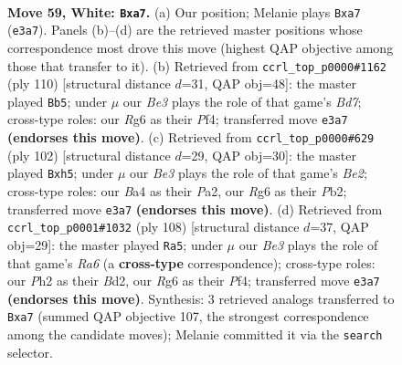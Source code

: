 \documentclass[11pt]{article}
\begin{document}
\clearpage

\begin{figure}[p]\centering
\begin{subfigure}{0.46\textwidth}\centering
\resizebox{\linewidth}{!}{%
\newchessgame
\chessboard[
  setfen={2k5/p1p5/6R1/3n1p2/B4P2/4B3/2K4P/8 w - - 1 59},
  showmover=false,
  pgfstyle=straightmove, color=movearrow, markmove={e3-a7}
]}
\caption{}
\end{subfigure}\hfill
\begin{subfigure}{0.46\textwidth}\centering
\resizebox{\linewidth}{!}{%
\newchessgame
\chessboard[
  setfen={8/3B1pk1/1p6/2n2p2/P4P1P/4K3/8/8 w - - 9 56},
  showmover=false,
  pgfstyle=straightmove, color=movearrow, markmove={d7-b5}
]}
\caption{}
\end{subfigure}
\\[4pt]
\begin{subfigure}{0.46\textwidth}\centering
\resizebox{\linewidth}{!}{%
\newchessgame
\chessboard[
  setfen={8/p7/8/6kp/1pK5/6n1/PP2B3/8 w - - 0 52},
  showmover=false,
  pgfstyle=straightmove, color=movearrow, markmove={e2-h5}
]}
\caption{}
\end{subfigure}\hfill
\begin{subfigure}{0.46\textwidth}\centering
\resizebox{\linewidth}{!}{%
\newchessgame
\chessboard[
  setfen={2b5/5k2/R4p2/7n/5Pp1/8/3B1K1P/8 w - - 6 55},
  showmover=false,
  pgfstyle=straightmove, color=movearrow, markmove={a6-a5}
]}
\caption{}
\end{subfigure}
\caption{\textbf{Move 59, White: \texttt{Bxa7}.} (a) Our position; Melanie plays \texttt{Bxa7} (\texttt{e3a7}). Panels (b)--(d) are the retrieved master positions whose correspondence most drove this move (highest QAP objective among those that transfer to it). (b) Retrieved from \texttt{ccrl\_top\_p0000\#1162} (ply 110) [structural distance $d$=31, QAP obj=48]: the master played \texttt{Bb5}; under $\mu$ our \emph{Be3} plays the role of that game's \emph{Bd7}; cross-type roles: our \emph{R}g6 as their \emph{P}f4; transferred move \texttt{e3a7} \textbf{(endorses this move)}. (c) Retrieved from \texttt{ccrl\_top\_p0000\#629} (ply 102) [structural distance $d$=29, QAP obj=30]: the master played \texttt{Bxh5}; under $\mu$ our \emph{Be3} plays the role of that game's \emph{Be2}; cross-type roles: our \emph{B}a4 as their \emph{P}a2, our \emph{R}g6 as their \emph{P}b2; transferred move \texttt{e3a7} \textbf{(endorses this move)}. (d) Retrieved from \texttt{ccrl\_top\_p0001\#1032} (ply 108) [structural distance $d$=37, QAP obj=29]: the master played \texttt{Ra5}; under $\mu$ our \emph{Be3} plays the role of that game's \emph{Ra6} (a \textbf{cross-type} correspondence); cross-type roles: our \emph{P}h2 as their \emph{B}d2, our \emph{R}g6 as their \emph{P}f4; transferred move \texttt{e3a7} \textbf{(endorses this move)}. Synthesis: 3 retrieved analogs transferred to \texttt{Bxa7} (summed QAP objective 107, the strongest correspondence among the candidate moves); Melanie committed it via the \texttt{search} selector.}
\label{fig:thought-m116}
\end{figure}
\end{document}
